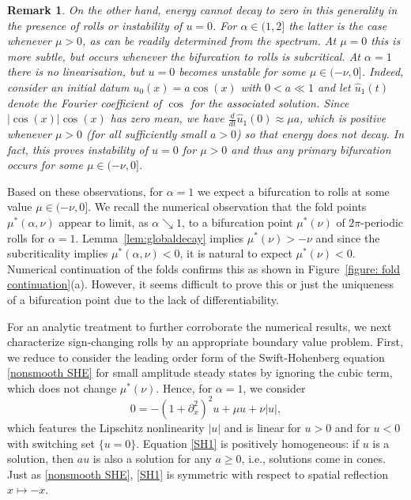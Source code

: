 \documentclass{article}
\numberwithin{equation}{section}
\newtheorem{remark}[theorem]{Remark}
\begin{document}
 \begin{remark}\label{rem:energynondecay}
 On the other hand, energy cannot decay to zero in this generality in the presence of rolls or instability of $u=0$. For $\alpha\in(1,2]$ the latter is the case whenever $\mu>0$, as can be readily determined from the spectrum. At $\mu=0$ this is more subtle, but occurs whenever the bifurcation to rolls is subcritical. At $\alpha=1$ there is no linearisation, but $u=0$ becomes unstable for some $\mu\in(-\nu,0]$. 
 Indeed, consider an initial datum $u_0(x)=a\cos(x)$ with $0<a\ll1$ and let $\hat u_1(t)$ denote the Fourier coefficient of $\cos$ for the associated solution. Since $|\cos(x)|\cos(x)$ has zero mean, we have $\tfrac{d}{dt}\hat u_1(0) \approx \mu a$, which is positive whenever $\mu>0$ (for all sufficiently small $a>0$) so that energy does not decay. In fact, this proves instability of $u=0$ for $\mu>0$ and thus any primary bifurcation occurs for some $\mu\in (-\nu,0]$.
 \end{remark}

  
Based on these observations, for $\alpha=1$ we expect a bifurcation to rolls at some value $\mu\in(-\nu,0]$. 
We recall the numerical observation that the fold points $\mu^*(\alpha,\nu)$ appear to limit, as $\alpha\searrow 1$, to a bifurcation point $\mu^*(\nu)$ of $2\pi$-periodic rolls for $\alpha = 1$. Lemma~\ref{lem:globaldecay} implies $\mu^*(\nu)>-\nu$ and since the subcriticality implies $\mu^*(\alpha,\nu)<0$, it is natural to expect $\mu^*(\nu)<0$. Numerical continuation of the folds confirms this as shown in Figure~\ref{figure: fold continuation}(a). However, it seems difficult to prove this or just the uniqueness of a bifurcation point due to the lack of differentiability. 

\medskip
For an analytic treatment to further corroborate the numerical results, we next characterize sign-changing rolls by an appropriate boundary value problem. First, we reduce to consider the leading order form of the Swift-Hohenberg equation \eqref{nonsmooth SHE} for small amplitude steady states by ignoring the cubic term, which does not change $\mu^*(\nu)$. Hence, for  $\alpha=1$, we consider		
		\begin{equation} \label{SH1}
			0 = - (1+\partial_x^2)^2 u + \mu u + \nu |u|, 
		\end{equation}
which features the Lipschitz nonlinearity $|u|$ and is linear for $u>0$ and for $u<0$ with switching set $\{u=0\}$. Equation \eqref{SH1} is positively homogeneous: if $u$ is a solution, then $a u$ is also a solution for any $a \geq 0$, i.e., solutions come in cones. Just as \eqref{nonsmooth SHE}, \eqref{SH1} is symmetric with respect to spatial reflection $x \mapsto -x$.
\end{document}
